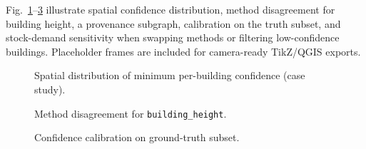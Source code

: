 Fig.~\ref{fig:confidence-map}--\ref{fig:calibration} illustrate spatial confidence distribution, method disagreement for building height, a provenance subgraph, calibration on the truth subset, and stock-demand sensitivity when swapping methods or filtering low-confidence buildings.
Placeholder frames are included for camera-ready TikZ/QGIS exports.

\begin{figure}[t]
  \centering
  \caption{Spatial distribution of minimum per-building confidence (case study).}
  \label{fig:confidence-map}
\end{figure}

\begin{figure}[t]
  \centering
  \caption{Method disagreement for \texttt{building\_height}.}
  \label{fig:disagreement}
\end{figure}

\begin{figure}[t]
  \centering
  \caption{Confidence calibration on ground-truth subset.}
  \label{fig:calibration}
\end{figure}

